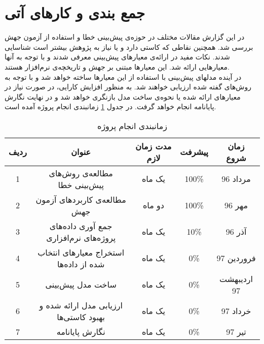 \section{جمع بندی و کارهای آتی}
\label{sec:future}
 در این گزارش مقالات مختلف در حوزه‌ی پیش‌بینی خطا و استفاده از آزمون جهش بررسی شد. همچنین نقاطی که  کاستی دارد و یا نیاز به پژوهش بیشتر است شناسایی شدند. نکات مفید در ارائه‌ی معیارهای پیش‌بینی معرفی شدند و با توجه به آنها معیارهایی ارائه شد. این معیارها مبتنی بر جهش و تاریخچه‌ی نرم‌افزار هستند.\\
 
   در آینده مدلهای پیش‌بینی با استفاده از این معیارها ساخته خواهد شد و با توجه به روش‌های گفته شده ارزیابی خواهند شد.  به منظور افزایش کارایی، در صورت نیاز در معیارهای ارائه شده یا نحوه‌ی ساخت مدل    بازنگری خواهد شد و در نهایت نگارش پایانامه انجام خواهد گرفت. در جدول \ref{tab:schedule} زمانبندی انجام پروژه آمده است.

\begin{table}[H] 
	\centering \caption{زمانبندی انجام پروژه}
	\label{tab:schedule}

	\begin{tabular}{|c|c|c|c|c|}
		\hline
		\hline
		 ردیف & عنوان & مدت زمان لازم & پیشرفت & زمان شروع
	 \\
		\hline
		\hline
1& مطالعه‌ی روش‌های پیش‌بینی خطا & یک ماه& 100\% & مرداد 96
		\\
		\hline
2 &مطالعه‌ی کاربردهای آزمون جهش  &دو ماه &100\%  &مهر 96 
		\\
		\hline
3 & جمع آوری داده‌های پروژه‌های نرم‌افزاری &  یک ماه& 10\% & آذر 96
		\\
		\hline
4 & استخراج معیارهای انتخاب شده از داده‌ها &  یک ماه& 0\% & فروردین 97
\\
\hline
5 & ساخت مدل پیش‌بینی &  یک ماه& 0\% & اردیبهشت 97
\\
\hline
6 & ارزیابی مدل ارائه شده و بهبود کاستی‌ها &  یک ماه& 0\% & خرداد 97
\\
\hline
7 & نگارش پایانامه &  یک ماه& 0\% & تیر 97\\


\hline
		
	 
	\end{tabular}
\end{table}
